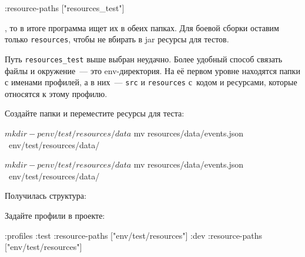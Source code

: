 \begin{english}
  \begin{clojure}
:resource-paths ["resources_test"]
  \end{clojure}
\end{english}

\noindent
, то в итоге программа ищет их в обеих папках. Для боевой сборки оставим только
\verb|resources|, чтобы не вбирать в jar ресурсы для тестов.


Путь \verb|resources_test| выше выбран неудачно. Более удобный способ связать
файлы и окружение~--- это env-директория. На её первом уровне находятся папки с
именами профилей, а в них~--- \verb|src| и \verb|resources| с~кодом и ресурсами,
которые относятся к этому профилю.

Создайте папки и переместите ресурсы для теста:

\ifnarrow

\begin{english}
  \begin{bash}
$ mkdir -p env/test/resources/data
$ mv resources/data/events.json \
     env/test/resources/data/
  \end{bash}
\end{english}

\else

\begin{english}
  \begin{bash}
$ mkdir -p env/test/resources/data
$ mv resources/data/events.json \
     env/test/resources/data/
  \end{bash}
\end{english}

\fi

\noindent
Получилась структура:

\iflarge\vspace{15mm}\pagebreak[4]\fi

\begin{english}
\end{english}


\linegap

\noindent
Задайте профили в проекте:

\ifnarrow

\begin{english}
  \begin{clojure}
:profiles
  {:test {:resource-paths
          ["env/test/resources"]}
   :dev {:resource-paths
         ["env/test/resources"]}}
  \end{clojure}
\end{english}

